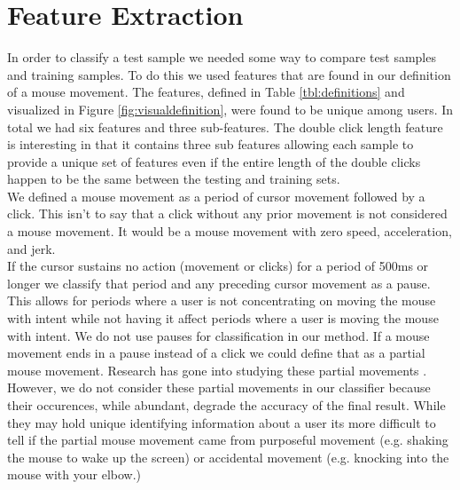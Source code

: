 \documentclass[conference]{IEEEtran}
\begin{document}
\section{Feature Extraction}
    In order to classify a test sample we needed some way to compare test samples and training samples. To do this we used features that are found in our definition of a mouse movement. The features, defined in Table \ref{tbl:definitions} and visualized in Figure \ref{fig:visualdefinition}, were found to be unique among users. In total we had six features and three sub-features. The double click length feature is interesting in that it contains three sub features allowing each sample to provide a unique set of features even if the entire length of the double clicks happen to be the same between the testing and training sets.\\
	We defined a mouse movement as a period of cursor movement followed by a click. This isn't to say that a click without any prior movement is not considered a mouse movement. It would be a mouse movement with zero speed, acceleration, and jerk. \\
	If the cursor sustains no action (movement or clicks) for a period of 500ms or longer we classify that period and any preceding cursor movement as a pause. This allows for periods where a user is not concentrating on moving the mouse with intent while not having it affect periods where a user is moving the mouse with intent. We do not use pauses for classification in our method. If a mouse movement ends in a pause instead of a click we could define that as a partial mouse movement. Research has gone into studying these partial movements \cite{Zhe}. However, we do not consider these partial movements in our classifier because their occurences, while abundant, degrade the accuracy of the final result. While they may hold unique identifying information about a user its more difficult to tell if the partial mouse movement came from purposeful movement (e.g. shaking the mouse to wake up the screen) or accidental movement (e.g. knocking into the mouse with your elbow.)
\end{document}
